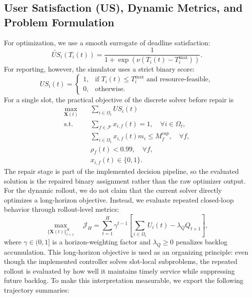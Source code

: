 \documentclass[pdflatex,sn-mathphys-num]{sn-jnl}
\begin{document}
\subsection{User Satisfaction (US), Dynamic Metrics, and Problem Formulation}
\label{sec:problem}
For optimization, we use a smooth surrogate of deadline satisfaction:
\begin{equation}
    \widetilde{US}_i(T_i(t)) = \frac{1}{1 + \exp(\nu (T_i(t) - T_i^{\max}))}.
\end{equation}
For reporting, however, the simulator uses a strict binary score:
\begin{equation}
    US_i(t)=
    \begin{cases}
        1, & \text{if } T_i(t) \le T_i^{\max} \text{ and resource-feasible},\\[2pt]
        0, & \text{otherwise}.
    \end{cases}
\end{equation}
For a single slot, the practical objective of the discrete solver before repair is
\begin{subequations}
\begin{align}
    \max_{\mathbf{X}(t)} \quad & \sum_{i \in \Omega_t} US_i(t) \\
    \text{s.t.} \quad & \sum_{f \in \mathcal{F}} x_{i,f}(t) = 1, \quad \forall i \in \Omega_t, \\
    & \sum_{i \in \Omega_t} x_{i,f}(t) m_i \le M_f^{cap}, \quad \forall f, \\
    & \rho_f(t) < 0.99, \quad \forall f, \\
    & x_{i,f}(t) \in \{0,1\}.
\end{align}
\end{subequations}
The repair stage is part of the implemented decision pipeline, so the evaluated solution is the repaired binary assignment rather than the raw optimizer output. For the dynamic rollout, we do not claim that the current solver directly optimizes a long-horizon objective. Instead, we evaluate repeated closed-loop behavior through rollout-level metrics:
\begin{equation}
    \max_{\{\mathbf{X}(t)\}_{t=1}^{H}} \quad \mathcal{J}_H = \sum_{t=1}^{H} \gamma^{t-1}\!\left[\sum_{i \in \Omega_t} U_i(t) - \lambda_Q Q_{t+1}\right],
\end{equation}
where $\gamma \in (0,1]$ is a horizon-weighting factor and $\lambda_Q \ge 0$ penalizes backlog accumulation. This long-horizon objective is used as an organizing principle: even though the implemented controller solves slot-local subproblems, the repeated rollout is evaluated by how well it maintains timely service while suppressing future backlog. To make this interpretation measurable, we export the following trajectory summaries:
\end{document}
